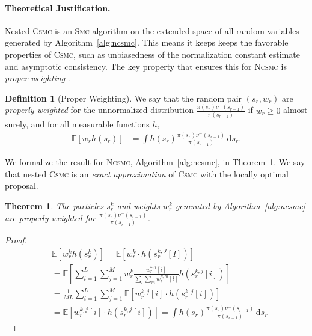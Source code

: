 \documentclass[accepted]{uai2021} %
\newtheorem{theorem}{Theorem}
\theoremstyle{definition}
\newtheorem{definition}{Definition}
\begin{document}
\paragraph{Theoretical Justification.}
Nested \textsc{Csmc} is an \textsc{Smc} algorithm on the extended space of all random variables generated by Algorithm~\ref{alg:ncsmc}. This means it keeps keeps the favorable properties of \textsc{Csmc}, such as unbiasedness of the normalization constant estimate and asymptotic consistency. The key property that ensures this for \textsc{Ncsmc} is \emph{proper weighting} \citep{naesseth2015nested,naesseth2016high}. 
\begin{definition}[Proper Weighting]
We say that the random pair $(s_r, w_r)$ are \emph{properly weighted} for the unnormalized distribution $\frac{\pi(s_r) \nu^-(s_{r-1})}{\pi(s_{r-1})}$ if $w_r \geq 0$ almost surely, and for all measurable functions $h$,
\begin{align}
    \mathbb{E}[w_r h(s_r)] &= \int h(s_r) \frac{\pi(s_r) \nu^-(s_{r-1})}{\pi(s_{r-1})} \, \mathrm{d}s_r.
\end{align}
\end{definition}
We formalize the result for \textsc{Ncsmc}, Algorithm~\ref{alg:ncsmc}, in Theorem~\ref{thm:pw}. We say that nested \textsc{Csmc} is an \emph{exact approximation} \citep{naesseth2019elements} of \textsc{Csmc} with the locally optimal proposal.
\begin{theorem}
The particles $s_r^k$ and weights $w_r^k$ generated by Algorithm~\ref{alg:ncsmc} are properly weighted for $\frac{\pi(s_r) \nu^-(s_{r-1})}{\pi(s_{r-1})}$.
\label{thm:pw}
\end{theorem}
\begin{proof}
\begin{align}
    &\mathbb{E}[w_r^k h(s_r^k)] = \mathbb{E}\left[w_r^k \cdot h(s_r^{k,J}[I])\right]   \nonumber \\
    &= \mathbb{E}\left[\sum_{i=1}^L \sum_{j=1}^M w_r^k \frac{w_r^{k,j}[i]}{\sum_l \sum_m w_r^{k,m}[l]} h(s_r^{k,j}[i])\right] \nonumber \\
    &= \frac{1}{ML} \sum_{i=1}^L \sum_{j=1}^M\mathbb{E}\left[w_r^{k,j}[i] \cdot h(s_r^{k,j}[i])\right] \nonumber \\
    &= \mathbb{E}\left[w_r^{k,j}[i] \cdot h(s_r^{k,j}[i])\right] = \int h(s_r) \frac{\pi(s_r) \nu^-(s_{r-1})}{\pi(s_{r-1})} \, \mathrm{d}s_r \nonumber
\end{align}
\end{proof}
\end{document}
